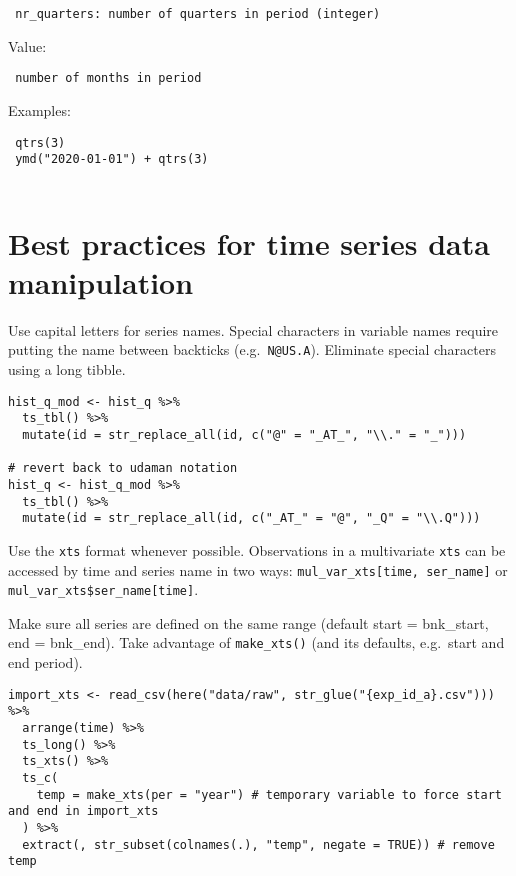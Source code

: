 \documentclass[
  letterpaper,
  DIV=11,
  numbers=noendperiod]{scrreport}
\begin{document}
\begin{verbatim}
 nr_quarters: number of quarters in period (integer)
\end{verbatim}

Value:

\begin{verbatim}
 number of months in period
\end{verbatim}

Examples:

\begin{verbatim}
 qtrs(3)
 ymd("2020-01-01") + qtrs(3)
 
\end{verbatim}


\hypertarget{best-practices-for-time-series-data-manipulation}{%
\chapter{Best practices for time series data
manipulation}\label{best-practices-for-time-series-data-manipulation}}

Use capital letters for series names. Special characters in variable
names require putting the name between backticks (e.g.~\texttt{N@US.A}).
Eliminate special characters using a long tibble.

\begin{verbatim}
hist_q_mod <- hist_q %>%
  ts_tbl() %>%
  mutate(id = str_replace_all(id, c("@" = "_AT_", "\\." = "_")))
  
# revert back to udaman notation
hist_q <- hist_q_mod %>%
  ts_tbl() %>%
  mutate(id = str_replace_all(id, c("_AT_" = "@", "_Q" = "\\.Q")))
\end{verbatim}

Use the \texttt{xts} format whenever possible. Observations in a
multivariate \texttt{xts} can be accessed by time and series name in two
ways: \texttt{mul\_var\_xts{[}time,\ ser\_name{]}} or
\texttt{mul\_var\_xts\$ser\_name{[}time{]}}.

Make sure all series are defined on the same range (default start =
bnk\_start, end = bnk\_end). Take advantage of \texttt{make\_xts()} (and
its defaults, e.g.~start and end period).

\begin{verbatim}
import_xts <- read_csv(here("data/raw", str_glue("{exp_id_a}.csv"))) %>%
  arrange(time) %>%
  ts_long() %>%
  ts_xts() %>%
  ts_c(
    temp = make_xts(per = "year") # temporary variable to force start and end in import_xts
  ) %>%
  extract(, str_subset(colnames(.), "temp", negate = TRUE)) # remove temp
\end{verbatim}
\end{document}
